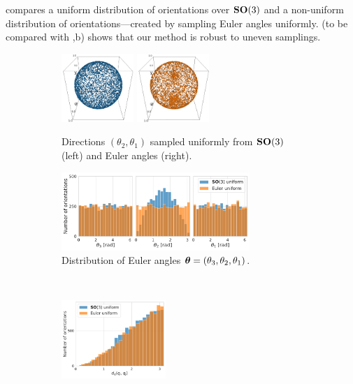  compares a uniform distribution of orientations over $\mathrm{\mathbf{SO}}(3)$ and a non-uniform distribution of orientations---created by sampling Euler angles uniformly. %
 (to be compared with ,b) shows that our method is robust to uneven samplings.

\begin{figure}[ht!]
    \centering
    \begin{subfigure}[b]{0.36\linewidth}
        \centering
        \includegraphics[height=7em]{figures/uniform_quaternion.png}%
        \hspace{1em}%
        \includegraphics[height=7em]{figures/uniform_angles.png}
        \caption{Directions $(\theta_2, \theta_1)$ sampled uniformly from $\mathrm{\mathbf{SO}}(3)$ (left) and Euler angles (right).}
    \end{subfigure}
    \hfill
    \begin{subfigure}[b]{0.58\linewidth}
        \centering
        \includegraphics[height=8em]{figures/uniform_quaternions_vs_angles_ang.pdf}
        \caption{Distribution of Euler angles ${\boldsymbol{\theta}} = (\theta_3,\theta_2,\theta_1)$.}
    \end{subfigure}
    \\ \vspace{1em}
    \begin{subfigure}[b]{0.36\linewidth}
        \centering
        \includegraphics[height=8em]{figures/dQ_5j0n_uniform_quaternions_vs_angles.pdf}

\end{subfigure}
\end{figure}
